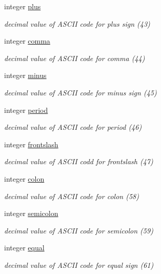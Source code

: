 \begin{DoxyCompactItemize}
integer \hyperlink{classascii_acbf5e3e62cf649d5d76cadb8d9684a34}{plus}
\begin{DoxyCompactList}\small\item\em decimal value of A\-S\-C\-I\-I code for plus sign (43) \end{DoxyCompactList}\item 
integer \hyperlink{classascii_a63814d48f038a8eedffaf01204ae1260}{comma}
\begin{DoxyCompactList}\small\item\em decimal value of A\-S\-C\-I\-I code for comma (44) \end{DoxyCompactList}\item 
integer \hyperlink{classascii_a0c61e89c207d71b8fbd48e8b052e1154}{minus}
\begin{DoxyCompactList}\small\item\em decimal value of A\-S\-C\-I\-I code for minus sign (45) \end{DoxyCompactList}\item 
integer \hyperlink{classascii_a7ab33aecf120d4c5c71c444ae16423f0}{period}
\begin{DoxyCompactList}\small\item\em decimal value of A\-S\-C\-I\-I code for period (46) \end{DoxyCompactList}\item 
integer \hyperlink{classascii_a78468f8ef6c28184ae59b14281466259}{frontslash}
\begin{DoxyCompactList}\small\item\em decimal value of A\-S\-C\-I\-I codd for frontslash (47) \end{DoxyCompactList}\item 
integer \hyperlink{classascii_ad2512b3c1ba1ee047cfb09f9d4e7663f}{colon}
\begin{DoxyCompactList}\small\item\em decimal value of A\-S\-C\-I\-I code for colon (58) \end{DoxyCompactList}\item 
integer \hyperlink{classascii_a648866ee03dcdc929278f97f17a9b860}{semicolon}
\begin{DoxyCompactList}\small\item\em decimal value of A\-S\-C\-I\-I code for semicolon (59) \end{DoxyCompactList}\item 
integer \hyperlink{classascii_ae67bd2130d7bf84100186dbc62548d07}{equal}
\begin{DoxyCompactList}\small\item\em decimal value of A\-S\-C\-I\-I code for equal sign (61) \end{DoxyCompactList}\item 

\end{DoxyCompactItemize}
